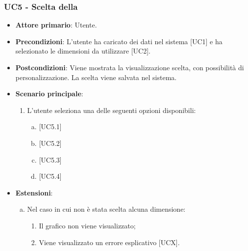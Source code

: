 \subsubsection{UC5 - Scelta della }
\begin{itemize}
	\item \textbf{Attore primario}: Utente.
	\item \textbf{Precondizioni}: L'utente ha caricato dei dati nel sistema [UC1] e ha selezionato le dimensioni da utilizzare [UC2].
	\item \textbf{Postcondizioni}: Viene mostrata la visualizzazione scelta, con possibilità di personalizzazione. La scelta viene salvata nel sistema.
	\item \textbf{Scenario principale}:
\begin{enumerate}
	\item	L'utente seleziona una delle seguenti opzioni disponibili:
		\begin{enumerate}[(a)]
			\item {}
			\item {}
			\item {}
			\item {}
		\end{enumerate}
\end{enumerate}
	\item \textbf{Estensioni}:
	\begin{enumerate}[(a)]
		\item Nel caso in cui non è stata scelta alcuna dimensione:
		\begin{enumerate}[1.]
			\item Il grafico non viene visualizzato;
			\item Viene visualizzato un errore esplicativo [UCX].
		\end{enumerate}
	\end{enumerate}
\end{itemize}